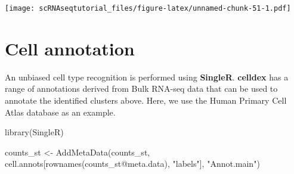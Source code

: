 \documentclass[
  openany]{book}
\newenvironment{Shaded}{\begin{snugshade}}{\end{snugshade}}
\newcommand{\AttributeTok}[1]{\textcolor[rgb]{0.77,0.63,0.00}{#1}}
\newcommand{\FunctionTok}[1]{\textcolor[rgb]{0.00,0.00,0.00}{#1}}
\newcommand{\NormalTok}[1]{#1}
\newcommand{\OtherTok}[1]{\textcolor[rgb]{0.56,0.35,0.01}{#1}}
\newcommand{\SpecialCharTok}[1]{\textcolor[rgb]{0.00,0.00,0.00}{#1}}
\newcommand{\StringTok}[1]{\textcolor[rgb]{0.31,0.60,0.02}{#1}}
\begin{document}
\texttt{[image: scRNAseqtutorial\_files/figure-latex/unnamed-chunk-51-1.pdf]}

\hypertarget{cell-annotation}{%
\section{Cell annotation}\label{cell-annotation}}

An unbiased cell type recognition is performed using \textbf{SingleR}. \textbf{celldex} has a range of annotations derived from Bulk RNA-seq data that can be used to annotate the identified clusters above. Here, we use the Human Primary Cell Atlas database as an example.

\begin{Shaded}
\begin{Highlighting}[]
\FunctionTok{library}\NormalTok{(SingleR)}
\end{Highlighting}
\end{Shaded}

\begin{Shaded}
\end{Shaded}

\begin{Shaded}
\begin{Highlighting}[]
\NormalTok{counts\_st }\OtherTok{\textless{}{-}}
  \FunctionTok{AddMetaData}\NormalTok{(counts\_st, cell.annots[}\FunctionTok{rownames}\NormalTok{(counts\_st}\SpecialCharTok{@}\NormalTok{meta.data), }\StringTok{"labels"}\NormalTok{], }\StringTok{"Annot.main"}\NormalTok{)}
\end{Highlighting}
\end{Shaded}
\end{document}
